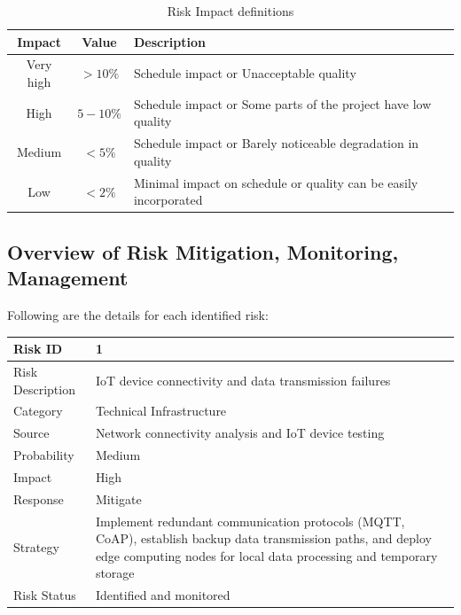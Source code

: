 \documentclass[oneside,a4paper,12pt]{book}
\renewcommand{\arraystretch}{1.5}
\begin{document}
\begin{table}[!htbp]
\begin{center}
\def\arraystretch{1.5}
\begin{tabularx}{\textwidth}{| c | c | X |}
\hline
Impact & Value	& Description \\ \hline
Very high &	$> 10 \%$ & Schedule impact or Unacceptable quality \\ \hline
High &	$5-10 \%$ & Schedule impact or Some parts of the project have low quality \\ \hline
Medium	& $ < 5 \% $ & Schedule impact or Barely noticeable degradation in quality \\ \hline
Low & $< 2 \%$ & Minimal impact on schedule or quality can be easily incorporated \\ \hline
\end{tabularx}
\end{center}
\caption{Risk Impact definitions}
\label{tab:riskImpactDef}
\end{table}

\subsection{Overview of Risk Mitigation, Monitoring, Management}

Following are the details for each identified risk:

\begin{table}[!htbp]
\begin{center}
\def\arraystretch{1.5}
\begin{tabularx}{\textwidth}{| l | X |}
\hline 
Risk ID	& 1 \\ \hline
Risk Description	& IoT device connectivity and data transmission failures \\ \hline
Category	& Technical Infrastructure \\ \hline
Source	& Network connectivity analysis and IoT device testing \\ \hline
Probability	& Medium \\ \hline
Impact	& High \\ \hline
Response	& Mitigate \\ \hline
Strategy	& Implement redundant communication protocols (MQTT, CoAP), establish backup data transmission paths, and deploy edge computing nodes for local data processing and temporary storage \\ \hline
Risk Status	& Identified and monitored \\ \hline
\end{tabularx}
\end{center}
\label{tab:risk1}
\end{table}
\end{document}
